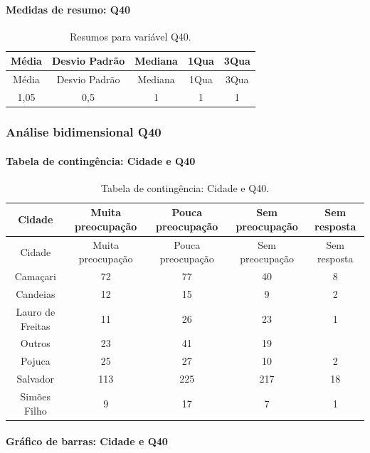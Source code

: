 \documentclass[]{article}
\let\oldparagraph\paragraph
\renewcommand{\paragraph}[1]{\oldparagraph{#1}\mbox{}}
\begin{document}
\hypertarget{medidas-de-resumo-q40}{%
\paragraph{Medidas de resumo: Q40}\label{medidas-de-resumo-q40}}

\begin{longtable}[]{@{}ccccc@{}}
\caption{\label{tab:unnamed-chunk-1545}Resumos para variável Q40.}\tabularnewline
\toprule
Média & Desvio Padrão & Mediana & 1Qua & 3Qua\tabularnewline
\midrule
\endfirsthead
\toprule
Média & Desvio Padrão & Mediana & 1Qua & 3Qua\tabularnewline
\midrule
\endhead
1,05 & 0,5 & 1 & 1 & 1\tabularnewline
\bottomrule
\end{longtable}

\cleardoublepage

\hypertarget{anuxe1lise-bidimensional-q40}{%
\subsubsection{Análise bidimensional Q40}\label{anuxe1lise-bidimensional-q40}}

\hypertarget{tabela-de-continguxeancia-cidade-e-q40}{%
\paragraph{Tabela de contingência: Cidade e Q40}\label{tabela-de-continguxeancia-cidade-e-q40}}

\begin{longtable}[]{@{}ccccc@{}}
\caption{\label{tab:unnamed-chunk-1546}Tabela de contingência: Cidade e Q40.}\tabularnewline
\toprule
Cidade & Muita preocupação & Pouca preocupação & Sem preocupação & Sem resposta\tabularnewline
\midrule
\endfirsthead
\toprule
Cidade & Muita preocupação & Pouca preocupação & Sem preocupação & Sem resposta\tabularnewline
\midrule
\endhead
Camaçari & 72 & 77 & 40 & 8\tabularnewline
Candeias & 12 & 15 & 9 & 2\tabularnewline
Lauro de Freitas & 11 & 26 & 23 & 1\tabularnewline
Outros & 23 & 41 & 19 &\tabularnewline
Pojuca & 25 & 27 & 10 & 2\tabularnewline
Salvador & 113 & 225 & 217 & 18\tabularnewline
Simões Filho & 9 & 17 & 7 & 1\tabularnewline
\bottomrule
\end{longtable}

\hypertarget{gruxe1fico-de-barras-cidade-e-q40}{%
\paragraph{Gráfico de barras: Cidade e Q40}\label{gruxe1fico-de-barras-cidade-e-q40}}
\end{document}
